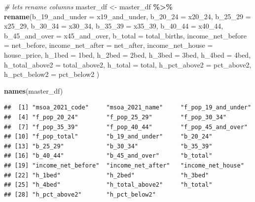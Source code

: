 \documentclass[
]{article}
\newenvironment{Shaded}{\begin{snugshade}}{\end{snugshade}}
\newcommand{\AttributeTok}[1]{\textcolor[rgb]{0.13,0.29,0.53}{#1}}
\newcommand{\CommentTok}[1]{\textcolor[rgb]{0.56,0.35,0.01}{\textit{#1}}}
\newcommand{\FunctionTok}[1]{\textcolor[rgb]{0.13,0.29,0.53}{\textbf{#1}}}
\newcommand{\NormalTok}[1]{#1}
\newcommand{\OtherTok}[1]{\textcolor[rgb]{0.56,0.35,0.01}{#1}}
\newcommand{\SpecialCharTok}[1]{\textcolor[rgb]{0.81,0.36,0.00}{\textbf{#1}}}
\newcommand{\StringTok}[1]{\textcolor[rgb]{0.31,0.60,0.02}{#1}}
\begin{document}
\begin{Shaded}
\begin{Highlighting}[]
\CommentTok{\# lets rename columns}
\NormalTok{master\_df }\OtherTok{\textless{}{-}}\NormalTok{ master\_df }\SpecialCharTok{\%\textgreater{}\%} 
  \FunctionTok{rename}\NormalTok{(}\AttributeTok{b\_19\_and\_under =}\NormalTok{ x19\_and\_under,}
         \AttributeTok{b\_20\_24 =}\NormalTok{ x20\_24,}
         \AttributeTok{b\_25\_29 =}\NormalTok{ x25\_29,}
         \AttributeTok{b\_30\_34 =}\NormalTok{ x30\_34,}
         \AttributeTok{b\_35\_39 =}\NormalTok{ x35\_39,}
         \AttributeTok{b\_40\_44 =}\NormalTok{ x40\_44,}
         \AttributeTok{b\_45\_and\_over =}\NormalTok{ x45\_and\_over,}
         \AttributeTok{b\_total =}\NormalTok{ total\_births,}
         \AttributeTok{income\_net\_before =}\NormalTok{ net\_before,}
         \AttributeTok{income\_net\_after =}\NormalTok{ net\_after,}
         \AttributeTok{income\_net\_house =}\NormalTok{ house\_price,}
         \AttributeTok{h\_1bed =} \StringTok{\textasciigrave{}}\AttributeTok{1bed}\StringTok{\textasciigrave{}}\NormalTok{,}
         \AttributeTok{h\_2bed =} \StringTok{\textasciigrave{}}\AttributeTok{2bed}\StringTok{\textasciigrave{}}\NormalTok{,}
         \AttributeTok{h\_3bed =} \StringTok{\textasciigrave{}}\AttributeTok{3bed}\StringTok{\textasciigrave{}}\NormalTok{,}
         \AttributeTok{h\_4bed =} \StringTok{\textasciigrave{}}\AttributeTok{4bed}\StringTok{\textasciigrave{}}\NormalTok{,}
         \AttributeTok{h\_total\_above2 =}\NormalTok{ total\_above2, }
         \AttributeTok{h\_total =}\NormalTok{ total,}
         \AttributeTok{h\_pct\_above2 =}\NormalTok{ pct\_above2,}
         \AttributeTok{h\_pct\_below2 =}\NormalTok{ pct\_below2}
\NormalTok{  )}
\end{Highlighting}
\end{Shaded}

\begin{Shaded}
\begin{Highlighting}[]
\FunctionTok{names}\NormalTok{(master\_df)}
\end{Highlighting}
\end{Shaded}

\begin{verbatim}
##  [1] "msoa_2021_code"     "msoa_2021_name"     "f_pop_19_and_under"
##  [4] "f_pop_20_24"        "f_pop_25_29"        "f_pop_30_34"       
##  [7] "f_pop_35_39"        "f_pop_40_44"        "f_pop_45_and_over" 
## [10] "f_pop_total"        "b_19_and_under"     "b_20_24"           
## [13] "b_25_29"            "b_30_34"            "b_35_39"           
## [16] "b_40_44"            "b_45_and_over"      "b_total"           
## [19] "income_net_before"  "income_net_after"   "income_net_house"  
## [22] "h_1bed"             "h_2bed"             "h_3bed"            
## [25] "h_4bed"             "h_total_above2"     "h_total"           
## [28] "h_pct_above2"       "h_pct_below2"
\end{verbatim}
\end{document}
